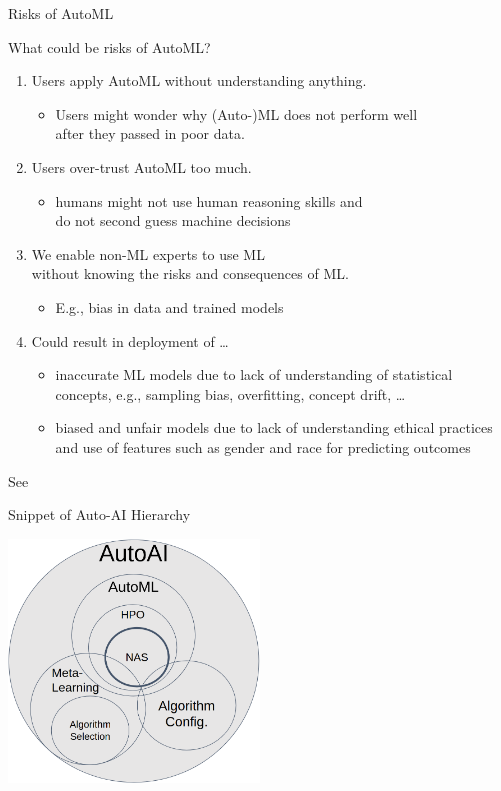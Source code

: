 \begin{frame}[c]{Risks of AutoML}

What could be risks of AutoML?

\begin{enumerate}
  \item Users apply AutoML \alert{without understanding} anything.
  \begin{itemize}
    \item Users might wonder why (Auto-)ML does not perform well\\ after they passed in poor data. 
  \end{itemize}
  \pause
  \item Users \alert{over-trust} AutoML too much.
  \begin{itemize}
    \item humans might not use human reasoning skills and\\ do not second guess machine decisions
  \end{itemize}
  \pause
  \item We enable non-ML experts to use ML\\ \alert{without knowing the risks and consequences} of ML.
  \begin{itemize}
  	\item E.g., bias in data and trained models
  \end{itemize}
  \pause
  \item Could result in deployment of \ldots
  \begin{itemize}
    \item inaccurate ML models due to lack of understanding of statistical concepts, e.g., sampling bias, overfitting, concept drift, \ldots
    \item biased and unfair models due to lack of understanding ethical practices and use of features such as gender and race for predicting outcomes
  \end{itemize}
\end{enumerate}

See 

\end{frame}
\begin{frame}[c]{Snippet of Auto-AI Hierarchy}

\centering
\includegraphics[width=0.5\textwidth]{images/autoai}

\end{frame}

